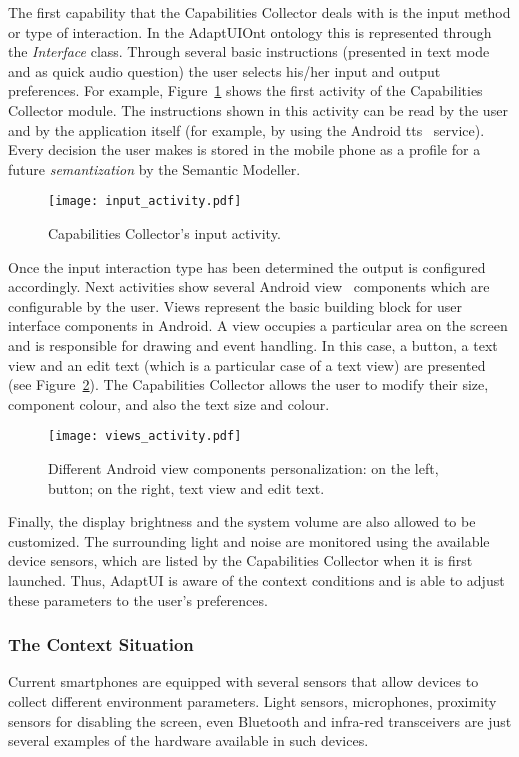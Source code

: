 The first capability that the Capabilities Collector deals with is the input
method or type of interaction. In the AdaptUIOnt ontology this is represented
through the \textit{Interface} class. Through several basic instructions
(presented in text mode and as quick audio question) the user selects his/her
input and output preferences. For example, Figure~\ref{fig:input_activity} shows
the first activity of the Capabilities Collector module. The instructions shown
in this activity can be read by the user and by the application itself (for
example, by using the Android \ac{tts}~\citep{tts} service). Every decision
the user makes is stored in the mobile phone as a profile for a future
\textit{semantization} by the Semantic Modeller.

\begin{figure}
\centering
\texttt{[image: input\_activity.pdf]}
\caption{Capabilities Collector's input activity.}
\label{fig:input_activity}
\end{figure}

Once the input interaction type has been determined the output is configured 
accordingly. Next activities show several Android view~\citep{android_view} 
components which are configurable by the user. Views represent the basic 
building block for user interface components in Android. A view occupies a 
particular area on the screen and is responsible for drawing and event 
handling. In this case, a button, a text view and an 
edit text (which is a particular case of a text view) are presented (see 
Figure~\ref{fig:views_activity}). The Capabilities Collector allows the user to 
modify their size, component colour, and also the text size and colour.

\begin{figure}
\centering
\texttt{[image: views\_activity.pdf]}
\caption{Different Android view components
personalization: on the left, button; on the right, text view and edit text.}
\label{fig:views_activity}
\end{figure}

Finally, the display brightness and the system volume are also allowed to be
customized. The surrounding light and noise are monitored using the available
device sensors, which are listed by the Capabilities Collector when it is first
launched. Thus, AdaptUI is aware of the context conditions and is able to adjust
these parameters to the user's preferences.

 
\subsubsection{The Context Situation}
\label{sec:context_situation}
Current smartphones are equipped with several sensors that allow devices to
collect different environment parameters. Light sensors, microphones, proximity 
sensors for disabling the screen, even Bluetooth and infra-red transceivers are 
just several examples of the hardware available in such devices.

